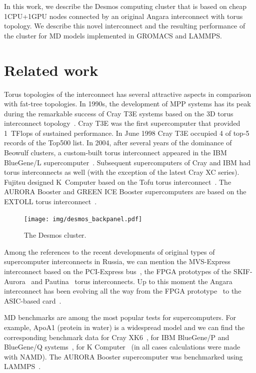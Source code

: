 \documentclass{llncs}
\begin{document}
In this work, we describe the Desmos computing cluster that is based on cheap 1CPU+1GPU nodes connected by an original Angara interconnect with torus topology. We describe this novel interconnect and the resulting performance of the cluster for MD models implemented in GROMACS and LAMMPS.


\section{Related work}

Torus topologies of the interconnect has several attractive aspects in comparison with fat-tree topologies. In 1990s, the development of MPP systems has its peak during the remarkable success of Cray T3E systems based on the 3D torus interconnect topology~\cite{Scott96thecray}. Cray T3E was the first supercomputer that provided 1~TFlops of sustained performance. In June 1998 Cray T3E occupied 4 of top-5 records of the Top500 list. In 2004, after several years of the dominance of Beowulf clusters, a custom-built torus interconnect appeared in the IBM BlueGene/L supercomputer~\cite{Adiga:2005:BGT:1665957.1665963}. Subsequent supercomputers of Cray and IBM had torus interconnects as well (with the exception of the latest Cray XC series). Fujitsu designed K~Computer based on the Tofu torus interconnect~\cite{Tofu-Interconnect-2012}. The AURORA Booster and GREEN ICE Booster supercomputers are based on the EXTOLL torus interconnect~\cite{Extoll-2015}.

\begin{figure}
\texttt{[image: img/desmos\_backpanel.pdf]}
\caption{The Desmos cluster.}
\end{figure}

Among the references to the recent developments of original types of supercomputer interconnects in Russia, we can mention the MVS-Express interconnect based on the PCI-Express bus~\cite{EliGorLev12}, the FPGA prototypes of the SKIF-Aurora~\cite{AdaKliKli10} and Pautina~\cite{KliShvKhr15} torus interconnects. Up to this moment the Angara interconnect has been evolving all the way from the FPGA prototype~\cite{KorMakBor10,MukSemSim15} to the ASIC-based card~\cite{AgIsmMakSemSim16}. 

MD benchmarks are among the most popular tests for supercomputers. For example, ApoA1 (protein in water) is a widespread model and we can find the corresponding benchmark data for Cray XK6~\cite{NAMD-CrayXK6-2012}, for IBM BlueGene/P and BlueGene/Q systems~\cite{NAMD-BlueGene-2013}, for K Computer~\cite{NAMD-KComputer} (in all cases calculations were made with NAMD). The AURORA Booster supercomputer was benchmarked using LAMMPS~\cite{Extoll-2015}.
\end{document}
